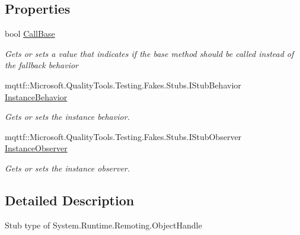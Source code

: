 \subsection*{Properties}
\begin{DoxyCompactItemize}
\item 
bool \hyperlink{class_system_1_1_runtime_1_1_remoting_1_1_fakes_1_1_stub_object_handle_a8a0140f15b4fe71fdf0b88976048bc5c}{Call\-Base}
\begin{DoxyCompactList}\small\item\em Gets or sets a value that indicates if the base method should be called instead of the fallback behavior\end{DoxyCompactList}\item 
mqttf\-::\-Microsoft.\-Quality\-Tools.\-Testing.\-Fakes.\-Stubs.\-I\-Stub\-Behavior \hyperlink{class_system_1_1_runtime_1_1_remoting_1_1_fakes_1_1_stub_object_handle_a80ce7e2e7947e66f58352ed0a6448a5f}{Instance\-Behavior}
\begin{DoxyCompactList}\small\item\em Gets or sets the instance behavior.\end{DoxyCompactList}\item 
mqttf\-::\-Microsoft.\-Quality\-Tools.\-Testing.\-Fakes.\-Stubs.\-I\-Stub\-Observer \hyperlink{class_system_1_1_runtime_1_1_remoting_1_1_fakes_1_1_stub_object_handle_a5643e2d7bbb78ff83cdf637289c3751d}{Instance\-Observer}
\begin{DoxyCompactList}\small\item\em Gets or sets the instance observer.\end{DoxyCompactList}\end{DoxyCompactItemize}


\subsection{Detailed Description}
Stub type of System.\-Runtime.\-Remoting.\-Object\-Handle



